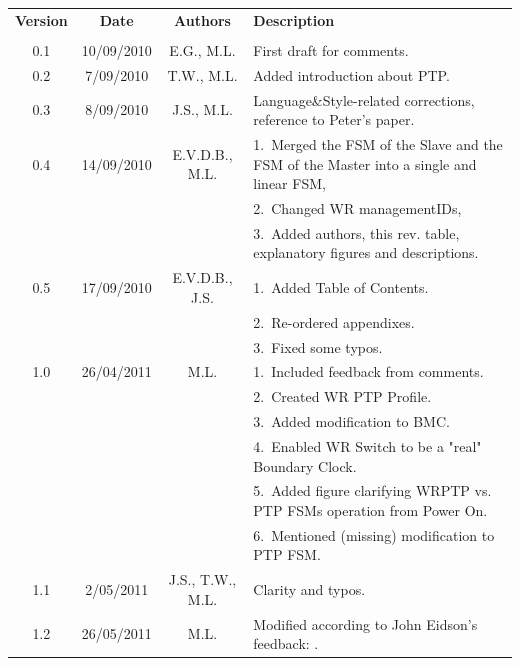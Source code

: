 \documentclass[a4paper, 12pt]{article}
\begin{document}
\begin{table}[ht!]
\centering
\begin{tabular}{| c |  c | c | p{8cm}    |}          \hline
\textbf{Version} & \textbf{Date} & \textbf{Authors} & \textbf{Description}  \\ 
 & &  &\\ \hline
0.1 & 10/09/2010 & E.G., M.L.   & First draft for comments.  \\ \hline
0.2 & 7/09/2010  & T.W., M.L.   & Added introduction about PTP.  \\ \hline
0.3 & 8/09/2010  & J.S., M.L.   & Language\&Style-related corrections, reference to Peter's paper.  
\\ \hline
0.4 & 14/09/2010 & E.V.D.B., M.L.& 1.~Merged the FSM of the Slave and the FSM of the Master into 
                                      a single and linear FSM,\\
    &            &              & 2.~Changed WR managementIDs,\\
    &            &              & 3.~Added authors, this rev. table, explanatory figures and 
                                                              descriptions. \\ \hline
0.5 & 17/09/2010 & E.V.D.B., J.S.& 1.~Added Table of Contents. \\
    &            &               & 2.~Re-ordered appendixes. \\
    &            &               & 3.~Fixed some typos. \\ 
\hline
1.0 & 26/04/2011 & M.L.          & 1.~Included feedback from comments. \\
    &            &               & 2.~Created WR PTP Profile. \\
    &            &               & 3.~Added modification to BMC. \\ 
    &            &               & 4.~Enabled WR Switch to be a "real" Boundary Clock. \\ 
    &            &               & 5.~Added figure clarifying WRPTP vs. PTP FSMs operation from 
                                      Power On. \\ 
    &            &               & 6.~Mentioned (missing) modification to PTP FSM. \\ 
\hline
1.1 & 2/05/2011  & J.S., T.W., M.L. & Clarity and typos. \\ 
\hline
1.2 & 26/05/2011 & M.L.          & Modified according to John Eidson's feedback: . \\

\end{tabular}
\end{table}
\end{document}
